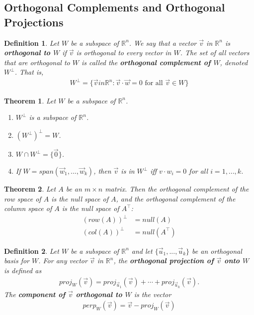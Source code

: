 \documentclass{article}
\theoremstyle{sltheorem}
\newtheorem{definition}{Definition}[section]
\newtheorem{theorem}{Theorem}[section]
\begin{document}
\subsection{Orthogonal Complements and Orthogonal Projections}
\begin{definition}
    Let $W$ be a subspace of $\mathbb{R}^n$. We say that a vector $\vec v$ in $\mathbb{R}^n$ is \textbf{orthogonal to $W$} if $\vec v$ is orthogonal to every vector in $W$. The set of all vectors that are orthogonal to $W$ is called the \textbf{orthogonal complement of $W$}, denoted $W^{\perp}$. That is,
    \begin{align*}
        W^{\perp} = \{\vec v in \mathbb{R}^n:\vec v \cdot \vec w = 0 \text{ for all }\vec v\in W\}
    \end{align*}
\end{definition}
\begin{theorem}
    Let $W$ be a subspace of $\mathbb{R}^n$.
    \begin{enumerate}
        \item $W^{\perp}$ is a subspace of $\mathbb{R}^n$.
        \item $\left(W^{\perp}\right)^{\perp}=W$.
        \item $W\cap W^{\perp}=\{\vec 0\}$.
        \item If $W=span({\vec w_1, ..., \vec w_k})$, then $\vec v$ is in $W^{\perp}$ iff $v\cdot w_i=0$ for all $i=1,...,k$.
    \end{enumerate}
\end{theorem}
\begin{theorem}
    Let $A$ be an $m\times n$ matrix. Then the orthogonal complement of the row space of $A$ is the null space of $A$, and the orthogonal complement of the column space of $A$ is the null space of $A^\intercal $:
    \begin{align*}
        (row(A))^{\perp}&=null(A)\\
        (col(A))^{\perp}&=null(A^\intercal )
    \end{align*}
\end{theorem}
\begin{definition}
    Let $W$ be a subspace of $\mathbb{R}^n$ and let $\{\vec u_1, ..., \vec u_k\}$ be an orthogonal basis for $W$.
    For any vector $\vec v$ in $\mathbb{R}^n$, the \textbf{orthogonal projection of $\vec v$ onto $W$} is defined as
    \begin{align*}
        proj_W(\vec v)=proj_{\vec u_1}(\vec v) + \cdots + proj_{\vec u_k}(\vec v).
    \end{align*}
    The \textbf{component of $\vec v$ orthogonal to $W$} is the vector
    \begin{align*}
        perp_W(\vec v) = \vec v - proj_W(\vec v)
    \end{align*}
\end{definition}
\end{document}
